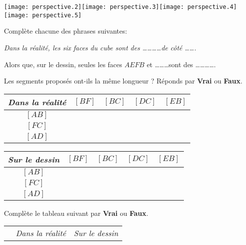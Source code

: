 \par
\texttt{[image: perspective.2]}\hfill\texttt{[image: perspective.3]}\hfill\texttt{[image: perspective.4]}\hfill\texttt{[image: perspective.5]}
\par
\begin{myenumerate}
\item Complète chacune des phrases suivantes:
\par{\em Dans la réalité, les six faces du cube sont des
\ldots\ldots\ldots\ldots de côté \ldots\ldots.
\par Alors que, sur le dessin, seules les faces $AEFB$ et
\ldots\ldots\ldots sont des \ldots\ldots\ldots\ldots.}
\item Les segments proposés ont-ils la même longueur ? Réponds par
{\bf Vrai} ou {\bf Faux}.
\par
\begin{tabular}{|c|c|c|c|c|}
\hline
{\em Dans la réalité}&\strut$[BF]$&$[BC]$&$[DC]$&$[EB]$ \\
\hline
\strut$[AB]$&&&&\\
\hline
\strut$[FC]$&&&&\\
\hline
\strut$[AD]$&&&&\\
\hline
\end{tabular}
\hfill
\begin{tabular}{|c|c|c|c|c|}
\hline
{\em Sur le dessin}&$[BF]$&$[BC]$&$[DC]$&$[EB]$ \\
\hline
$[AB]$&&&&\\
\hline
$[FC]$&&&&\\
\hline
$[AD]$&&&&\\
\hline
\end{tabular}
\item Complète le tableau suivant par {\bf Vrai} ou {\bf Faux}.
\begin{center}
\begin{tabular}{|c|c|c|}
\cline{2-3}
\multicolumn{1}{c|}{}&{\em Dans la réalité}&{\em Sur le dessin}\\

\end{tabular}
\end{center}
\end{myenumerate}

